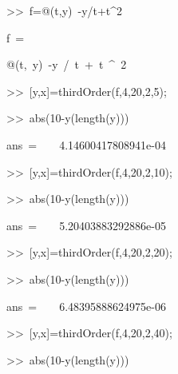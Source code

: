\begin{description}
\begin{lyxcode}
>\textcompwordmark >~f=@(t,y)~-y/t+t\textasciicircum 2

f~=

@(t,~y)~-y~/~t~+~t~\textasciicircum ~2

>\textcompwordmark >~{[}y,x{]}=thirdOrder(f,4,20,2,5);

>\textcompwordmark >~abs(10-y(length(y)))

ans~=~~~~4.14600417808941e-04

>\textcompwordmark >~{[}y,x{]}=thirdOrder(f,4,20,2,10);

>\textcompwordmark >~abs(10-y(length(y)))

ans~=~~~~5.20403883292886e-05

>\textcompwordmark >~{[}y,x{]}=thirdOrder(f,4,20,2,20);

>\textcompwordmark >~abs(10-y(length(y)))

ans~=~~~~6.48395888624975e-06

>\textcompwordmark >~{[}y,x{]}=thirdOrder(f,4,20,2,40);

>\textcompwordmark >~abs(10-y(length(y)))


\end{lyxcode}
\end{description}
